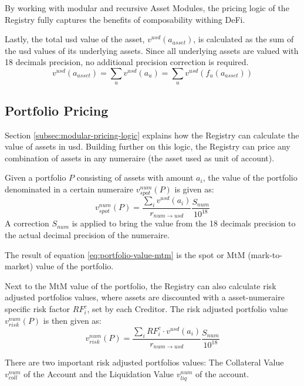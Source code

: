 \documentclass[sigconf,nonacm]{acmart}
\begin{document}
By working with modular and recursive Asset Modules, the pricing logic of the Registry fully captures the benefits of composability withing DeFi.

Lastly, the total usd value of the asset, $v^{usd}(a_{asset})$, is calculated as the sum of the usd values of its underlying assets.
Since all underlying assets are valued with 18 decimals precision, no additional precision correction is required.
\begin{equation}
    v^{usd}(a_{asset}) = \sum_{u}{v^{usd}(a_{u})} = \sum_{u}{v^{usd}(f_{u}(a_{asset}))}
\end{equation}

\subsection{Portfolio Pricing}
\label{subsec:portfolio-pricing}
Section \ref{subsec:modular-pricing-logic} explains how the Registry can calculate the value of assets in usd.
Building further on this logic, the Registry can price any combination of assets in any numeraire (the asset used as unit of account).

Given a portfolio $P$ consisting of assets with amount $a_{i}$, the value of the portfolio denominated in a certain numeraire $v_{spot}^{num}(P)$ is given as:
\begin{equation}
    \label{eq:portfolio-value-mtm}
    v_{spot}^{num}(P) = \frac{\sum_{i}{v^{usd}(a_{i})}}{r_{num\rightarrow usd}}\frac{S_{num}}{10^{18}}
\end{equation}
A correction $S_{num}$ is applied to bring the value from the 18 decimals precision to the actual decimal precision of the numeraire.

The result of equation \ref{eq:portfolio-value-mtm} is the spot or MtM (mark-to-market) value of the portfolio.

Next to the MtM value of the portfolio, the Registry can also calculate risk adjusted portfolios values,
where assets are discounted with a asset-numeraire specific risk factor $RF_{i}^{c}$, set by each Creditor.
The risk adjusted portfolio value $v_{risk}^{num}(P)$ is then given as:
\begin{equation}
    \label{eq:portfolio-value-risk-adjusted}
    v_{risk}^{num}(P) = \frac{\sum_{i}{RF_{i}^{c} \cdot v^{usd}(a_{i})}}{r_{num\rightarrow usd}}\frac{S_{num}}{10^{18}}
\end{equation}

There are two important risk adjusted portfolios values: The Collateral Value $v_{coll}^{num}$ of the Account and the Liquidation Value $v_{liq}^{num}$ of the account.
\end{document}
